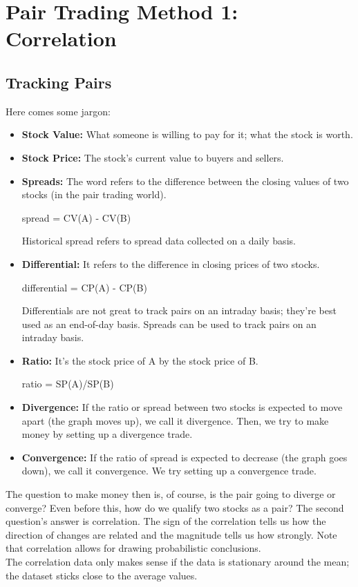\documentclass{article}
\begin{document}
\section{Pair Trading Method 1: Correlation}
\subsection{Tracking Pairs}
Here comes some jargon:
\begin{itemize}
    \item \textbf{Stock Value: }What someone is willing to pay for it; what the stock is worth.
    \item \textbf{Stock Price: }The stock's current value to buyers and sellers.
    \item \textbf{Spreads:} The word refers to the difference between the closing values of two stocks (in the pair trading world).\\
    \begin{center}
        spread = CV(A) - CV(B)
    \end{center}
    Historical spread refers to spread data collected on a daily basis.
    \item \textbf{Differential:} It refers to the difference in closing prices of two stocks.
    \begin{center}
        differential = CP(A) - CP(B)
    \end{center}  
    Differentials are not great to track pairs on an intraday basis; they're best used as an end-of-day basis. Spreads can be used to track pairs on an intraday basis.
    \item \textbf{Ratio:} It's the stock price of A by the stock price of B.
    \begin{center}
        ratio = SP(A)/SP(B)
    \end{center}
    \item \textbf{Divergence: }If the ratio or spread between two stocks is expected to move apart (the graph moves up), we call it divergence. Then, we try to make money by setting up a divergence trade.
    \item \textbf{Convergence: }If the ratio of spread is expected to decrease (the graph goes down), we call it convergence. We try setting up a convergence trade.
\end{itemize}
The question to make money then is, of course, is the pair going to diverge or converge? Even before this, how do we qualify two stocks as a pair? The second 
question's answer is correlation. The sign of the correlation tells us how the direction of changes are related and the magnitude tells us how strongly.
Note that correlation allows for drawing probabilistic conclusions.\\
The correlation data only makes sense if the data is stationary around the mean; 
the dataset sticks close to the average values.\\
\end{document}
